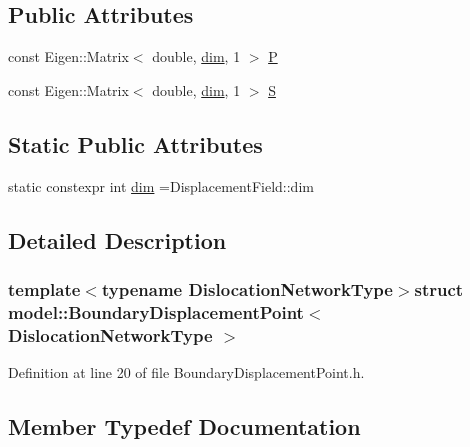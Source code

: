 \subsection*{Public Attributes}
\begin{DoxyCompactItemize}
\item 
const Eigen\+::\+Matrix$<$ double, \hyperlink{structmodel_1_1_boundary_displacement_point_a3e7d3e8f8cd6043d4a0d205cfef01f12}{dim}, 1 $>$ \hyperlink{structmodel_1_1_boundary_displacement_point_af3affa7a82c35585750f37307fdf6494}{P}
\item 
const Eigen\+::\+Matrix$<$ double, \hyperlink{structmodel_1_1_boundary_displacement_point_a3e7d3e8f8cd6043d4a0d205cfef01f12}{dim}, 1 $>$ \hyperlink{structmodel_1_1_boundary_displacement_point_a3df09dfc180e657ab0cd184f55a15100}{S}
\end{DoxyCompactItemize}
\subsection*{Static Public Attributes}
\begin{DoxyCompactItemize}
\item 
static constexpr int \hyperlink{structmodel_1_1_boundary_displacement_point_a3e7d3e8f8cd6043d4a0d205cfef01f12}{dim} =Displacement\+Field\+::dim
\end{DoxyCompactItemize}


\subsection{Detailed Description}
\subsubsection*{template$<$typename Dislocation\+Network\+Type$>$struct model\+::\+Boundary\+Displacement\+Point$<$ Dislocation\+Network\+Type $>$}



Definition at line 20 of file Boundary\+Displacement\+Point.\+h.



\subsection{Member Typedef Documentation}
\hypertarget{structmodel_1_1_boundary_displacement_point_a23fe64b184320beea9fb5279bb488820}{}
